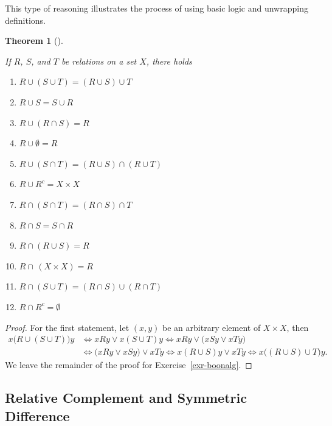 \documentclass[
  letterpaper,
  10pt,
  reqno,
  twopage,
  openany]{book}
\providecommand{\tightlist}{%
  \setlength{\itemsep}{0pt}\setlength{\parskip}{0pt}}\usepackage{longtable,booktabs,array}
\theoremstyle{plain}
\theoremstyle{definition}
\theoremstyle{definition}
\theoremstyle{definition}
\theoremstyle{plain}
\theoremstyle{plain}
\newtheorem{theorem}{Theorem}[chapter]
\theoremstyle{remark}
\begin{document}
This type of reasoning illustrates the process of using basic logic and
unwrapping definitions.

\leavevmode{}%
\begin{theorem}[]\label{thm-boonalg}

If \(R\), \(S\), and \(T\) be relations on a set \(X\), there holds

\begin{enumerate}
\def\labelenumi{\arabic{enumi}.}
\tightlist
\item
  \({R\cup(S\cup T)=(R\cup S)\cup T}\)
\item
  \(R \cup S = S \cup R\)
\item
  \(R \cup (R \cap S) = R\)
\item
  \(R \cup \emptyset = R\)
\item
  \({R \cup (S \cap T) = (R \cup S) \cap (R \cup T)}\)
\item
  \(R \cup R^c = X\times X\)
\item
  \(R\cap(S\cap T)=(R\cap S)\cap T\)
\item
  \(R \cap S = S \cap R\)
\item
  \(R \cap (R \cup S) = R\)
\item
  \(R \cap \, (X\times X) = R\)
\item
  \({R \cap (S \cup T) = (R \cap S) \cup (R \cap T)}\)
\item
  \(R \cap R^c = \emptyset\)
\end{enumerate}

\end{theorem}

\begin{proof}

For the first statement, let \((x,y)\) be an arbitrary element of
\(X\times X\), then \begin{align*}
x\big(R\cup(S\cup T)\big)y & \Leftrightarrow xRy \lor x(S\cup T)y  \Leftrightarrow x Ry \lor \Big(xSy \lor xTy \Big) \\
& \Leftrightarrow \Big( xRy \lor xSy \Big) \lor xTy  \Leftrightarrow x(R\cup S)y \lor xTy  \Leftrightarrow x\big(( R\cup S) \cup T\big)y. 
\end{align*} We leave the remainder of the proof for
Exercise~\ref{exr-boonalg}.

\end{proof}

\hypertarget{relative-complement-and-symmetric-difference}{%
\subsection{Relative Complement and Symmetric
Difference}\label{relative-complement-and-symmetric-difference}}
\end{document}

